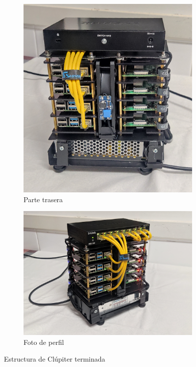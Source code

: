 \begin{itemize}
\begin{figure}[h!]
\begin{subfigure}[c]{0.4\textwidth}
        \includegraphics[width=\textwidth]{img/fotos_estructura/back.jpg}
        \caption{Parte trasera}
        \label{fig:fotos_estructura_back}
    \end{subfigure}

    \begin{subfigure}[c]{0.7\textwidth}
        \includegraphics[width=\textwidth]{img/fotos_estructura/style.jpg}
        \caption{Foto de perfil}
        \label{fig:fotos_estructura_style}
    \end{subfigure}
    \caption{Estructura de Clúpiter terminada}
    \label{fig:fotos_estructura}
    \end{figure}


\end{itemize}

